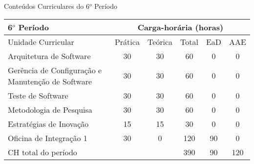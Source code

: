 \begin{quadro}[ht!]
\centering
\caption{Conteúdos Curriculares do 6$^o$ Período}\label{qua:periodo6}
\begin{tabular}{|p{8.0cm}|c|c|c|c|c|}
\hline
\rowcolor{blue1} 6$^o$ Período & \multicolumn{5}{|c|}{\centering Carga-horária (horas)} \\ \hline
\rowcolor{blue1} Unidade Curricular & Prática & Teórica & Total & EaD & AAE \\ \hline
Arquitetura de Software & 30 & 30 & 60 & 0	&	0 \\	\hline
Gerência de Configuração e Manutenção de Software & 30 & 30 & 60 & 0	&	0 \\	\hline
Teste de Software  & 30 & 30 & 60 & 0	&	0 \\	\hline
Metodologia de Pesquisa & 30 & 30 & 60 & 0	&	0 \\	\hline
Estratégias de Inovação & 15 & 15 & 30 & 0	&	0 \\	\hline
Oficina de Integração 1 & 30 & 0 & 120 & 90	&	0 \\	\hline
CH total do período & \multicolumn{2}{p{3.3cm}|}{\cellcolor{blue1}} & 390 & 90	&	120 \\ \hline
\end{tabular} \end{quadro}